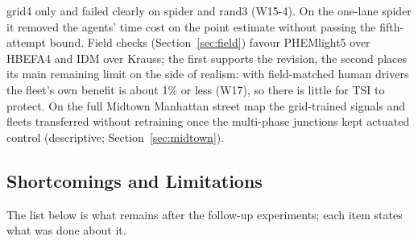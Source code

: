\begin{itemize}
grid4 only and failed clearly on spider and rand3 (W15-4). On the one-lane spider it removed the agents' time cost on the point estimate without passing the
fifth-attempt bound. Field checks (Section~\ref{sec:field}) favour PHEMlight5 over HBEFA4 and IDM over Krauss; the first supports the revision,
the second places its main remaining limit on the side of realism: with field-matched human drivers the fleet's own benefit is about 1\%
or less (W17), so there is little for TSI to protect. On the full Midtown Manhattan street map the grid-trained signals and fleets
transferred without retraining once the multi-phase junctions kept actuated control (descriptive; Section~\ref{sec:midtown}).
\end{itemize}

\subsection{Shortcomings and Limitations}
The list below is what remains after the follow-up experiments; each item states what was done about it.
